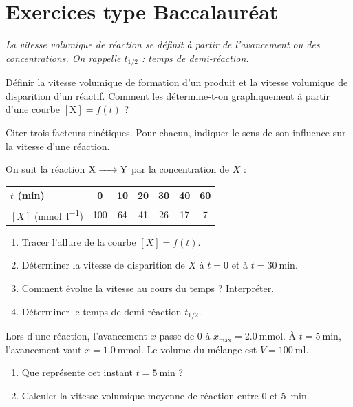 \section{Exercices type Baccalauréat}
\textit{La vitesse volumique de réaction se définit à partir de l'avancement ou des
concentrations. On rappelle $t_{1/2}$ : temps de demi-réaction.}


\exo{} Définir la vitesse volumique de formation d'un produit et la vitesse
volumique de disparition d'un réactif. Comment les détermine-t-on graphiquement à
partir d'une courbe $[\text{X}] = f(t)$ ?

\exo{} Citer trois facteurs cinétiques. Pour chacun, indiquer le sens de son
influence sur la vitesse d'une réaction.

\exo{} On suit la réaction $\ce{X -> Y}$ par la concentration de $X$ :
\begin{center}\small
\begin{tabular}{l|cccccc}
$t$ (\si{\minute}) & 0 & 10 & 20 & 30 & 40 & 60 \\ \hline
$[X]$ (\si{\milli\mol\per\litre}) & 100 & 64 & 41 & 26 & 17 & 7 \\
\end{tabular}
\end{center}
\begin{enumerate}[label=\arabic*)]
\item Tracer l'allure de la courbe $[X]=f(t)$.
\item Déterminer la vitesse de disparition de $X$ à $t = 0$ et à $t = \SI{30}{\minute}$.
\item Comment évolue la vitesse au cours du temps ? Interpréter.
\item Déterminer le temps de demi-réaction $t_{1/2}$.
\end{enumerate}

\exo{} Lors d'une réaction, l'avancement $x$ passe de $0$ à
$x_{\max} = \SI{2.0}{\milli\mol}$. À $t = \SI{5}{\minute}$, l'avancement vaut
$x = \SI{1.0}{\milli\mol}$. Le volume du mélange est $V = \SI{100}{\milli\litre}$.
\begin{enumerate}[label=\arabic*)]
\item Que représente cet instant $t = \SI{5}{\minute}$ ?
\item Calculer la vitesse volumique moyenne de réaction entre $0$ et \SI{5}{\minute}.
\end{enumerate}

